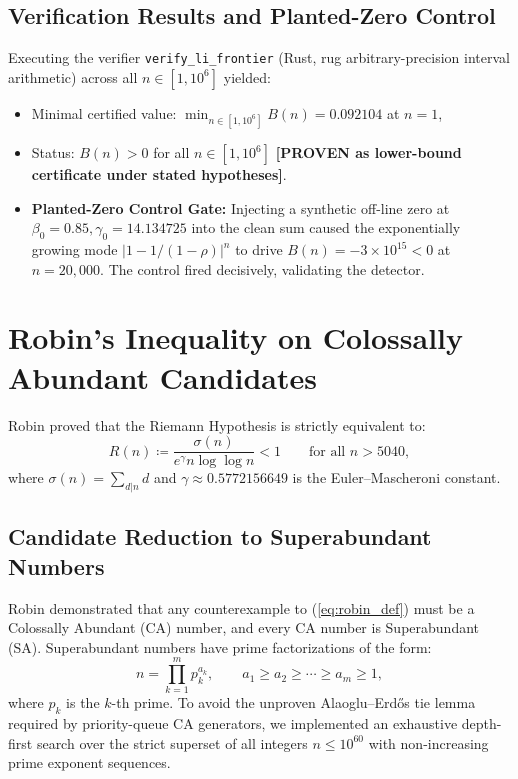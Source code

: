 \documentclass[11pt,a4paper]{article}
\theoremstyle{remark}
\begin{document}
\subsection{Verification Results and Planted-Zero Control}
Executing the verifier \texttt{verify\_li\_frontier} (Rust, rug arbitrary-precision interval arithmetic) across all $n \in [1, 10^6]$ yielded:
\begin{itemize}
\item Minimal certified value: $\min_{n \in [1, 10^6]} B(n) = 0.092104$ at $n=1$,
\item Status: $B(n) > 0$ for all $n \in [1, 10^6]$ \textbf{[PROVEN as lower-bound certificate under stated hypotheses]}.
\item \textbf{Planted-Zero Control Gate:} Injecting a synthetic off-line zero at $\beta_0 = 0.85, \gamma_0 = 14.134725$ into the clean sum caused the exponentially growing mode $|1 - 1/(1-\rho)|^n$ to drive $B(n) = -3 \times 10^{15} < 0$ at $n = 20{,}000$. The control fired decisively, validating the detector.
\end{itemize}

\section{Robin's Inequality on Colossally Abundant Candidates}

Robin \cite{robin1984} proved that the Riemann Hypothesis is strictly equivalent to:
\begin{equation}
 R(n) \coloneqq \frac{\sigma(n)}{e^\gamma n \log\log n} < 1 \qquad \text{for all } n > 5040,
 \label{eq:robin_def}
\end{equation}
where $\sigma(n) = \sum_{d|n} d$ and $\gamma \approx 0.5772156649$ is the Euler--Mascheroni constant.

\subsection{Candidate Reduction to Superabundant Numbers}
Robin demonstrated that any counterexample to (\ref{eq:robin_def}) must be a Colossally Abundant (CA) number, and every CA number is Superabundant (SA). Superabundant numbers have prime factorizations of the form:
\[
 n = \prod_{k=1}^m p_k^{a_k}, \qquad a_1 \ge a_2 \ge \cdots \ge a_m \ge 1,
\]
where $p_k$ is the $k$-th prime. To avoid the unproven Alaoglu--Erd\H{o}s tie lemma required by priority-queue CA generators, we implemented an exhaustive depth-first search over the strict superset of all integers $n \le 10^{60}$ with non-increasing prime exponent sequences.
\end{document}
